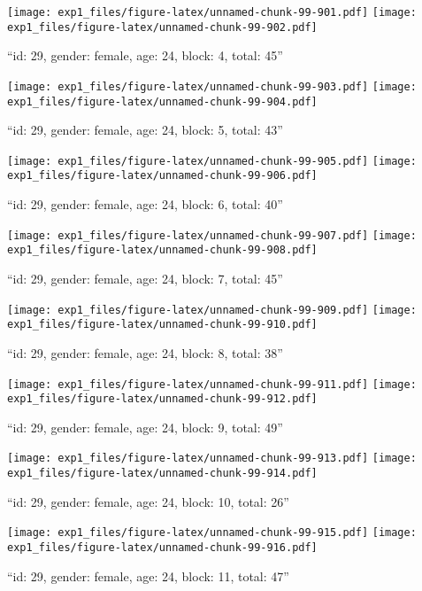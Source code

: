 \documentclass[,]{article}
\begin{document}
\texttt{[image: exp1\_files/figure-latex/unnamed-chunk-99-901.pdf]}
\texttt{[image: exp1\_files/figure-latex/unnamed-chunk-99-902.pdf]}

\newpage
[1] 

``id: 29, gender: female, age: 24, block: 4, total: 45''

\texttt{[image: exp1\_files/figure-latex/unnamed-chunk-99-903.pdf]}
\texttt{[image: exp1\_files/figure-latex/unnamed-chunk-99-904.pdf]}

\newpage
[1] 

``id: 29, gender: female, age: 24, block: 5, total: 43''

\texttt{[image: exp1\_files/figure-latex/unnamed-chunk-99-905.pdf]}
\texttt{[image: exp1\_files/figure-latex/unnamed-chunk-99-906.pdf]}

\newpage
[1] 

``id: 29, gender: female, age: 24, block: 6, total: 40''

\texttt{[image: exp1\_files/figure-latex/unnamed-chunk-99-907.pdf]}
\texttt{[image: exp1\_files/figure-latex/unnamed-chunk-99-908.pdf]}

\newpage
[1] 

``id: 29, gender: female, age: 24, block: 7, total: 45''

\texttt{[image: exp1\_files/figure-latex/unnamed-chunk-99-909.pdf]}
\texttt{[image: exp1\_files/figure-latex/unnamed-chunk-99-910.pdf]}

\newpage
[1] 

``id: 29, gender: female, age: 24, block: 8, total: 38''

\texttt{[image: exp1\_files/figure-latex/unnamed-chunk-99-911.pdf]}
\texttt{[image: exp1\_files/figure-latex/unnamed-chunk-99-912.pdf]}

\newpage
[1] 

``id: 29, gender: female, age: 24, block: 9, total: 49''

\texttt{[image: exp1\_files/figure-latex/unnamed-chunk-99-913.pdf]}
\texttt{[image: exp1\_files/figure-latex/unnamed-chunk-99-914.pdf]}

\newpage
[1] 

``id: 29, gender: female, age: 24, block: 10, total: 26''

\texttt{[image: exp1\_files/figure-latex/unnamed-chunk-99-915.pdf]}
\texttt{[image: exp1\_files/figure-latex/unnamed-chunk-99-916.pdf]}

\newpage
[1] 

``id: 29, gender: female, age: 24, block: 11, total: 47''
\end{document}
